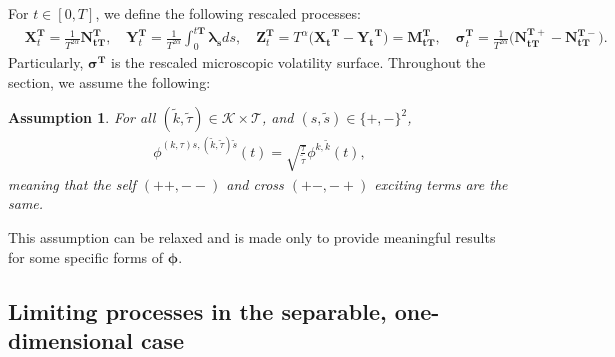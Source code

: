 \documentclass[12pt]{article}
\newtheorem{assumption}[theorem2]{Assumption}
\begin{document}
For $t\in[0,T]$, we define the following rescaled processes:
\begin{align*}
    & \mathbf{X}_t^{\mathbf{T}}=\frac{1}{T^{2\alpha}}\mathbf{N_{tT}^T}, \quad \mathbf{Y}_t^{\mathbf{T}}=\frac{1}{T^{2\alpha}}\int_0^{t\mathbf T} \boldsymbol{\lambda}_{\mathbf{s}} ds, \quad \mathbf{Z}_t^{\mathbf{T}}=T^{\alpha}\big(\mathbf{X_t}^{\mathbf{T}} - \mathbf{Y_t}^{\mathbf{T}} \big) =  \mathbf{M_{tT}^T}, \quad \boldsymbol{\sigma}_t^{\mathbf{T}} = \frac{1}{T^{2\alpha}}\big( \mathbf{N}_{\mathbf{tT}}^{\mathbf {T}+}-\mathbf{N}_{\mathbf{tT}}^{\mathbf {T}-} \big).
\end{align*}
Particularly, $\boldsymbol{\sigma^T}$ is the rescaled microscopic volatility surface. Throughout the section, we assume the following:
\begin{assumption}
For all $(\tilde{k},\tilde{\tau})\in \mathcal{K}\times\mathcal{T}$, and $(s,\tilde{s})\in \{+,-\}^2$, 
\begin{align*}
    \phi^{(k,\tau)s,(\tilde{k},\tilde{\tau})\tilde{s}}(t) = \sqrt{\frac{\tau}{\tilde{\tau}}}\phi^{k,\tilde{k}}(t),
\end{align*}
meaning that the self $(++,--)$ and cross $(+-,-+)$ exciting terms are the same.
\end{assumption}
This assumption can be relaxed and is made only to provide meaningful results for some specific forms of $\boldsymbol{\phi}$. 

\subsection{Limiting processes in the separable, one-dimensional case}
\end{document}
